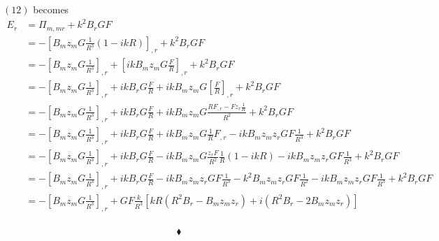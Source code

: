 $(12)$ becomes
\begin{align}
E_r&= \Pi_{m,mr}+k^2B_rGF\\
&= -\left[B_mz_mG\frac{1}{R^3}\left(1-ikR\right)\right]_{,r}+k^2B_rGF\\
&= -\left[B_mz_mG\frac{1}{R^3}\right]_{,r}+\left[ikB_mz_mG\frac{F}{R}\right]_{,r}+k^2B_rGF\\
&= -\left[B_mz_mG\frac{1}{R^3}\right]_{,r}+ikB_rG\frac{F}{R}+ikB_mz_mG\left[\frac{F}{R}\right]_{,r}+k^2B_rGF\\
&= -\left[B_mz_mG\frac{1}{R^3}\right]_{,r}+ikB_rG\frac{F}{R}+ikB_mz_mG\frac{RF_{,r}-Fz_r\frac{1}{R}}{R^2}+k^2B_rGF\\
&= -\left[B_mz_mG\frac{1}{R^3}\right]_{,r}+ikB_rG\frac{F}{R}+ikB_mz_mG\frac{1}{R}F_{,r}-ikB_mz_mz_rGF\frac{1}{R^3}+k^2B_rGF\\
&= -\left[B_mz_mG\frac{1}{R^3}\right]_{,r}+ikB_rG\frac{F}{R}-ikB_mz_mG\frac{z_rF}{R^2}\frac{1}{R}\left(1-ikR\right)-ikB_mz_mz_rGF\frac{1}{R^3}+k^2B_rGF\\
&= -\left[B_mz_mG\frac{1}{R^3}\right]_{,r}+ikB_rG\frac{F}{R}-ikB_mz_mz_rGF\frac{1}{R^3}-k^2B_mz_mz_rGF\frac{1}{R^2}-ikB_mz_mz_rGF\frac{1}{R^3}+k^2B_rGF\\
&= -\left[B_mz_mG\frac{1}{R^3}\right]_{,r}+GF\frac{k}{R^3}\left[kR\left(R^2B_r-B_mz_mz_r\right)+i\left(R^2B_r-2B_mz_mz_r\right)\right]\\
\end{align}

$$\blacklozenge$$
\newpage




